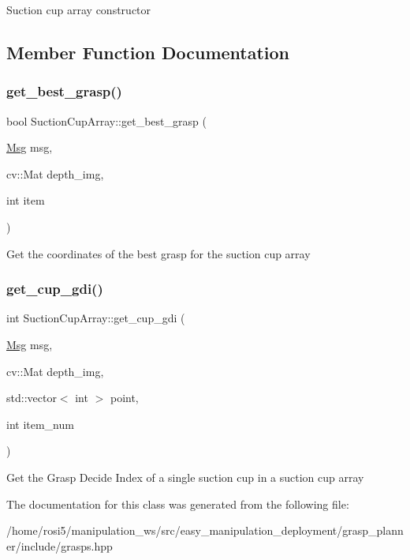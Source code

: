 Suction cup array constructor 

\subsection{Member Function Documentation}
\mbox{\label{classSuctionCupArray_a342e3be05d1d154a6d7ae1c3564db2d5}} 
\subsubsection{\texorpdfstring{get\+\_\+best\+\_\+grasp()}{get\_best\_grasp()}}
{\footnotesize\ttfamily bool Suction\+Cup\+Array\+::get\+\_\+best\+\_\+grasp (\begin{DoxyParamCaption}\item[{\hyperlink{classMsg}{Msg}}]{msg,  }\item[{cv\+::\+Mat}]{depth\+\_\+img,  }\item[{int}]{item }\end{DoxyParamCaption})\hspace{0.3cm}{\ttfamily [inline]}}

Get the coordinates of the best grasp for the suction cup array \mbox{\label{classSuctionCupArray_ae7cb79c848f3067b11cfc98751e143a4}} 
\subsubsection{\texorpdfstring{get\+\_\+cup\+\_\+gdi()}{get\_cup\_gdi()}}
{\footnotesize\ttfamily int Suction\+Cup\+Array\+::get\+\_\+cup\+\_\+gdi (\begin{DoxyParamCaption}\item[{\hyperlink{classMsg}{Msg}}]{msg,  }\item[{cv\+::\+Mat}]{depth\+\_\+img,  }\item[{std\+::vector$<$ int $>$}]{point,  }\item[{int}]{item\+\_\+num }\end{DoxyParamCaption})\hspace{0.3cm}{\ttfamily [inline]}}

Get the Grasp Decide Index of a single suction cup in a suction cup array 

The documentation for this class was generated from the following file\+:\begin{DoxyCompactItemize}
\item 
/home/rosi5/manipulation\+\_\+ws/src/easy\+\_\+manipulation\+\_\+deployment/grasp\+\_\+planner/include/grasps.\+hpp\end{DoxyCompactItemize}
